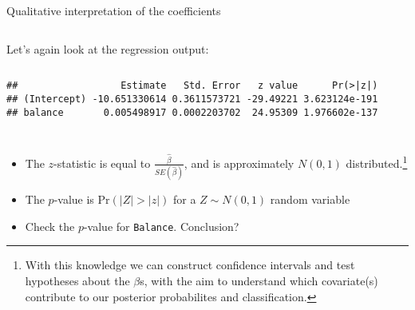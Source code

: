 \documentclass[10pt,ignorenonframetext,]{beamer}
\newenvironment{Shaded}{\begin{snugshade}}{\end{snugshade}}
\newcommand{\KeywordTok}[1]{\textcolor[rgb]{0.13,0.29,0.53}{\textbf{#1}}}
\newcommand{\NormalTok}[1]{#1}
\newcommand{\OperatorTok}[1]{\textcolor[rgb]{0.81,0.36,0.00}{\textbf{#1}}}
\providecommand{\tightlist}{%
  \setlength{\itemsep}{0pt}\setlength{\parskip}{0pt}}
\begin{document}
\begin{frame}[fragile]

\begin{block}{Qualitative interpretation of the coefficients}

\(~\)

Let's again look at the regression output:

\(~\)

\scriptsize

\begin{Shaded}
\end{Shaded}

\begin{verbatim}
##                  Estimate   Std. Error   z value      Pr(>|z|)
## (Intercept) -10.651330614 0.3611573721 -29.49221 3.623124e-191
## balance       0.005498917 0.0002203702  24.95309 1.976602e-137
\end{verbatim}

\(~\)

\(~\)

\normalsize

\begin{itemize}
\tightlist
\item
  The \(z\)-statistic is equal to \(\frac{\hat\beta}{SE(\hat\beta)}\),
  and is approximately \(N(0,1)\)
  distributed.\footnote{With this knowledge we can construct confidence intervals and test hypotheses about the $\beta$s, with the aim to understand which covariate(s) contribute to our posterior probabilites and classification.}
\end{itemize}

\vspace{2mm}

\begin{itemize}
\tightlist
\item
  The \(p\)-value is \(\text{Pr}(|Z| > |z|)\) for a \(Z\sim N(0,1)\)
  random variable
\end{itemize}

\vspace{2mm}

\begin{itemize}
\tightlist
\item
  Check the \(p\)-value for \texttt{Balance}. Conclusion?
\end{itemize}

\end{block}

\end{frame}
\end{document}
